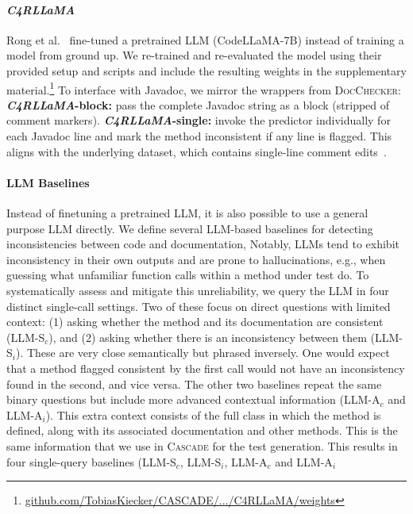 \documentclass[acmsmall, screen]{acmart}
\newcommand{\tool}{\textsc{Cascade}\xspace}
\begin{document}
\paragraph{\textit{C4RLLaMA}}
Rong et al.~\cite{carlama} fine-tuned a pretrained LLM (CodeLLaMA-7B) instead of training a model from ground up. We re-trained and re-evaluated the model using their provided setup and scripts and include the resulting weights in the supplementary material.\footnote{\href{https://github.com/TobiasKiecker/CASCADE/blob/FSE2026-v1.0.0/PaperEvaluation/drivers/C4RLLaMA/weights/README.md}{github.com/TobiasKiecker/CASCADE/.../C4RLLaMA/weights}}
To interface with Javadoc, we mirror the wrappers from \textsc{DocChecker}:
\textbf{\textit{C4RLLaMA}-block:} pass the complete Javadoc string as a block (stripped of comment markers).
\textbf{\textit{C4RLLaMA}-single:} invoke the predictor individually for each Javadoc line and mark the method inconsistent if any line is flagged.
This aligns with the underlying dataset, which contains single-line comment edits~\cite{panthaplackel2020learning}.


\paragraph{LLM Baselines}
Instead of finetuning a pretrained LLM, it is also possible to use a general purpose LLM directly.
We define several LLM-based baselines for detecting inconsistencies between code and documentation, 
Notably, LLMs tend to exhibit inconsistency in their own outputs and are prone to hallucinations, e.g., when guessing what unfamiliar function calls within a method under test do. 
To systematically assess and mitigate this unreliability, we query the LLM in four distinct single-call settings. Two of these focus on direct questions with limited context: (1) asking whether the method and its documentation are consistent (LLM-S$_c$), and (2) asking whether there is an inconsistency between them (LLM-S$_i$). These are very close semantically but phrased inversely. One would expect that a method flagged consistent by the first call would not have an inconsistency found in the second, and vice versa. 
The other two baselines repeat the same binary questions but include more advanced contextual information (LLM-A$_c$ and LLM-A$_i$).  This extra context consists of the full class in which the method is defined, along with its associated documentation and other methods. This is the same information that we use in \tool for the test generation. This results in four single-query baselines (LLM-S$_c$, LLM-S$_i$, LLM-A$_c$ and LLM-A$_i$
\end{document}
